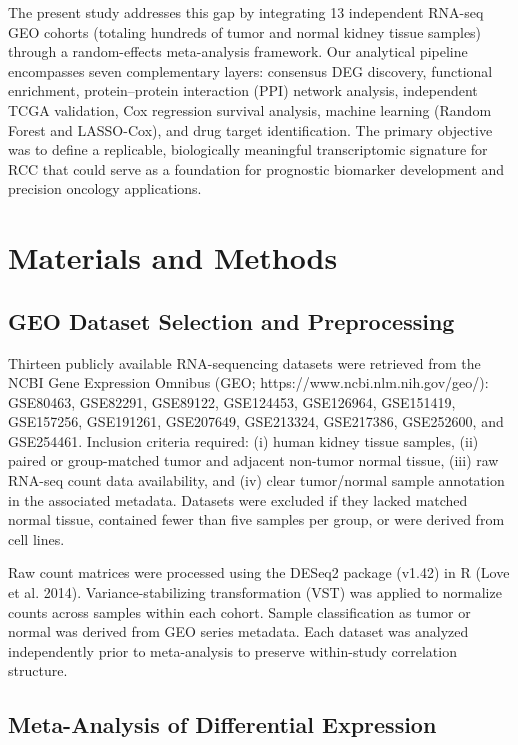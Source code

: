\documentclass[
  12pt,
]{article}
\begin{document}
The present study addresses this gap by integrating 13 independent
RNA-seq GEO cohorts (totaling hundreds of tumor and normal kidney tissue
samples) through a random-effects meta-analysis framework. Our
analytical pipeline encompasses seven complementary layers: consensus
DEG discovery, functional enrichment, protein--protein interaction (PPI)
network analysis, independent TCGA validation, Cox regression survival
analysis, machine learning (Random Forest and LASSO-Cox), and drug
target identification. The primary objective was to define a replicable,
biologically meaningful transcriptomic signature for RCC that could
serve as a foundation for prognostic biomarker development and precision
oncology applications.

\section{Materials and Methods}\label{materials-and-methods}

\subsection{GEO Dataset Selection and
Preprocessing}\label{geo-dataset-selection-and-preprocessing}

Thirteen publicly available RNA-sequencing datasets were retrieved from
the NCBI Gene Expression Omnibus (GEO;
https://www.ncbi.nlm.nih.gov/geo/): GSE80463, GSE82291, GSE89122,
GSE124453, GSE126964, GSE151419, GSE157256, GSE191261, GSE207649,
GSE213324, GSE217386, GSE252600, and GSE254461. Inclusion criteria
required: (i) human kidney tissue samples, (ii) paired or group-matched
tumor and adjacent non-tumor normal tissue, (iii) raw RNA-seq count data
availability, and (iv) clear tumor/normal sample annotation in the
associated metadata. Datasets were excluded if they lacked matched
normal tissue, contained fewer than five samples per group, or were
derived from cell lines.

Raw count matrices were processed using the DESeq2 package (v1.42) in R
(Love et al. 2014). Variance-stabilizing transformation (VST) was
applied to normalize counts across samples within each cohort. Sample
classification as tumor or normal was derived from GEO series metadata.
Each dataset was analyzed independently prior to meta-analysis to
preserve within-study correlation structure.

\subsection{Meta-Analysis of Differential
Expression}\label{meta-analysis-of-differential-expression}
\end{document}
